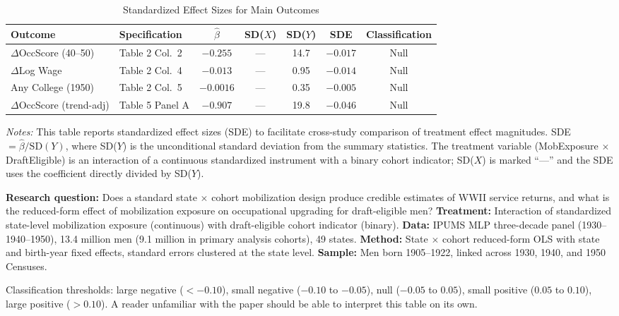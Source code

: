 \documentclass[12pt]{article}
\begin{document}
\begin{table}[H]
\centering
\caption{Standardized Effect Sizes for Main Outcomes}
\label{tab:sde}
\begin{adjustbox}{max width=\textwidth}
\begin{tabular}{llccccc}
\toprule
Outcome & Specification & $\hat{\beta}$ & SD($X$) & SD($Y$) & SDE & Classification \\
\midrule
$\Delta$OccScore (40--50) & Table 2 Col.\ 2 & $-0.255$ & --- & 14.7 & $-0.017$ & Null \\
$\Delta$Log Wage & Table 2 Col.\ 4 & $-0.013$ & --- & 0.95 & $-0.014$ & Null \\
Any College (1950) & Table 2 Col.\ 5 & $-0.0016$ & --- & 0.35 & $-0.005$ & Null \\
$\Delta$OccScore (trend-adj) & Table 5 Panel A & $-0.907$ & --- & 19.8 & $-0.046$ & Null \\
\bottomrule
\end{tabular}
\end{adjustbox}
\par\vspace{0.3em}
{\footnotesize \emph{Notes:} This table reports standardized effect sizes (SDE)
to facilitate cross-study comparison of treatment effect magnitudes.
SDE $= \hat{\beta} / \text{SD}(Y)$, where SD($Y$) is the unconditional standard deviation from the summary statistics.
The treatment variable (MobExposure $\times$ DraftEligible) is an interaction of a continuous standardized instrument with a binary cohort indicator; SD($X$) is marked ``---'' and the SDE uses the coefficient directly divided by SD($Y$).

\textbf{Research question:} Does a standard state $\times$ cohort mobilization design produce credible estimates of WWII service returns, and what is the reduced-form effect of mobilization exposure on occupational upgrading for draft-eligible men?
\textbf{Treatment:} Interaction of standardized state-level mobilization exposure (continuous) with draft-eligible cohort indicator (binary).
\textbf{Data:} IPUMS MLP three-decade panel (1930--1940--1950), 13.4 million men (9.1 million in primary analysis cohorts), 49 states.
\textbf{Method:} State $\times$ cohort reduced-form OLS with state and birth-year fixed effects, standard errors clustered at the state level.
\textbf{Sample:} Men born 1905--1922, linked across 1930, 1940, and 1950 Censuses.

Classification thresholds:
large negative ($< -0.10$), small negative ($-0.10$ to $-0.05$),
null ($-0.05$ to $0.05$), small positive ($0.05$ to $0.10$),
large positive ($> 0.10$).
A reader unfamiliar with the paper should be able to interpret this table
on its own.}
\end{table}
\end{document}

